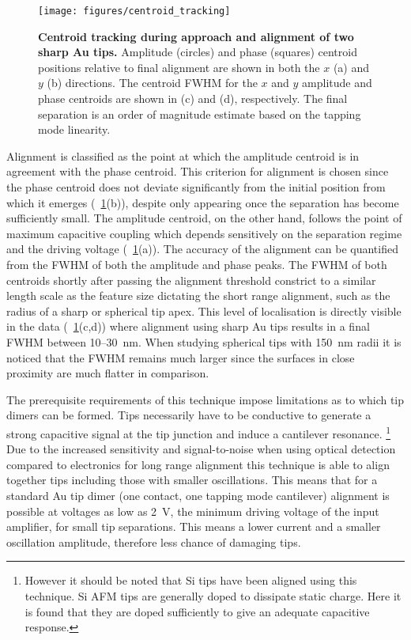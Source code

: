 \documentclass{article}
\begin{document}
\begin{figure}[h]
\centering
\texttt{[image: figures/centroid\_tracking]}
\caption[Centroid tracking during approach and alignment of two sharp Au tips]{\textbf{Centroid tracking during approach and alignment of two sharp Au tips.} Amplitude (circles) and phase (squares) centroid positions relative to final alignment are shown in both the $x$ (a) and $y$ (b) directions. The centroid FWHM for the $x$ and $y$ amplitude and phase centroids are shown in (c) and (d), respectively. The final separation is an order of magnitude estimate based on the tapping mode linearity.}
\label{fig:centroid_tracking}
\end{figure}

Alignment is classified as the point at which the amplitude centroid is in agreement with the phase centroid. This criterion for alignment is chosen since the phase centroid does not deviate significantly from the initial position from which it emerges (\figurename~\ref{fig:centroid_tracking}(b)), despite only appearing once the separation has become sufficiently small. The amplitude centroid, on the other hand, follows the point of maximum capacitive coupling which depends sensitively on the separation regime and the driving voltage (\figurename~\ref{fig:centroid_tracking}(a)).
The accuracy of the alignment can be quantified from the FWHM of both the amplitude and phase peaks. The FWHM of both centroids shortly after passing the alignment threshold constrict to a similar length scale as the feature size dictating the short range alignment, such as the radius of a sharp or spherical tip apex. This level of localisation is directly visible in the data (\figurename~\ref{fig:centroid_tracking}(c,d)) where alignment using sharp Au tips results in a final FWHM between 10--\SI{30}{nm}. When studying spherical tips with \SI{150}{nm} radii it is noticed that the FWHM remains much larger since the surfaces in close proximity are much flatter in comparison. %

The prerequisite requirements of this technique impose limitations as to which tip dimers can be formed. Tips necessarily have to be conductive to generate a strong capacitive signal at the tip junction and induce a cantilever resonance.%
\footnote{However it should be noted that Si tips have been aligned using this technique. Si AFM tips are generally doped to dissipate static charge. Here it is found that they are doped sufficiently to give an adequate capacitive response.}
Due to the increased sensitivity and signal-to-noise when using optical detection compared to electronics for long range alignment this technique is able to align together tips including those with smaller oscillations. This means that for a standard Au tip dimer (one contact, one tapping mode cantilever) alignment is possible at voltages as low as \SI{2}{V}, the minimum driving voltage of the input amplifier, for small tip separations. This means a lower current and a smaller oscillation amplitude, therefore less chance of damaging tips.
\end{document}
